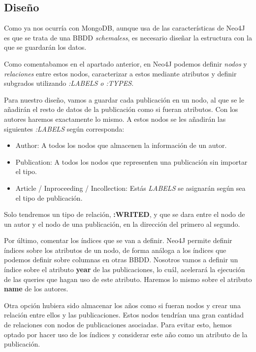 \subsection{Diseño}

Como ya nos ocurría con MongoDB, aunque usa de las características de Neo4J es que se trata de una \gls{BBDD} \textit{schemaless}, es necesario diseñar la estructura con la que se guardarán los datos. 

Como comentabamos en el apartado anterior, en Neo4J podemos definir \textit{nodos} y \textit{relaciones} entre estos nodos, caracterizar a estos mediante atributos y definir subgrados utilizando \textit{:LABELS o :TYPES}. 

Para nuestro diseño, vamos a guardar cada publicación en un nodo, al que se le añadirán el resto de datos de la publicación como si fueran atributos. Con los autores haremos exactamente lo mismo. A estos nodos se les añadirán las siguientes \textit{:LABELS} según corresponda:

\begin{itemize}
 \item Author: A todos los nodos que almacenen la información de un autor.
 \item Publication: A todos los nodos que representen una publicación sin importar el tipo.
 \item Article / Inproceeding / Incollection: Estás \textit{LABELS} se asignarán según sea el tipo de publicación. 
\end{itemize}

Solo tendremos un tipo de relación, \textbf{:WRITED}, y que se dara entre el nodo de un autor y el nodo de una publicación, en la dirección del primero al segundo.

Por último, comentar los índices que se van a definir. Neo4J permite definir índices sobre los atributos de un nodo, de forma análoga a los índices que podemos definir sobre columnas en otras \gls{BBDD}. Nosotros vamos a definir un índice sobre el atributo \textbf{year} de las publicaciones, lo cuál, acelerará la ejecución de las queries que hagan uso de este atributo. Haremos lo mismo sobre el atributo \textbf{name} de los autores.

Otra opción hubiera sido almacenar los años como si fueran nodos y crear una relación entre ellos y las publicaciones. Estos nodos tendrían una gran cantidad de relaciones con nodos de publicaciones asociadas. Para evitar esto, hemos optado por hacer uso de los índices y considerar este año como un atributo de la publicación.

